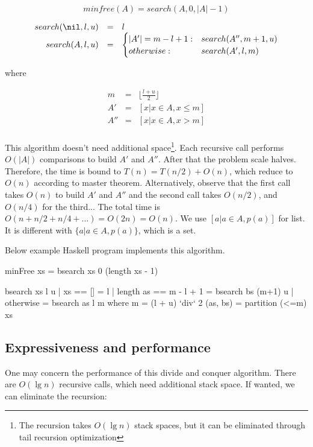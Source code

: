 \documentclass[b5paper]{article}
\begin{document}
\[
minfree(A) = search(A, 0, |A|-1)
\]

\[
\begin{array}{rcl}
search(\nil, l, u) & = & l \\
search(A, l, u) & = & \begin{cases}
       |A'| = m - l + 1 : & search(A'', m+1, u) \\
       otherwise : & search(A',  l, m) \\
\end{cases}
\end{array}
\]

where

\[ \begin{array}{rcl}
m & = & \displaystyle \lfloor \frac{l+u}{2} \rfloor \\
A' & = & [ x | x \in A, x \leq m ] \\
A''& = & [ x | x \in A, x > m ] \\
\end{array} \]

This algorithm doesn't need additional space\footnote{The recursion takes $O(\lg n)$ stack spaces, but it can be eliminated through tail recursion optimization}. Each recursive call performs $O(|A|)$ comparisons to build $A'$ and $A''$. After that the problem scale halves. Therefore, the time is bound to $T(n) = T(n/2) + O(n)$, which reduce to $O(n)$ according to master theorem. Alternatively, observe that the first call takes $O(n)$ to build $A'$ and $A''$ and the second call takes $O(n/2)$, and $O(n/4)$ for the third... The total time is $O(n + n/2 + n/4 + ...) = O(2n) = O(n)$. We use $[a | a \in A, p(a)]$ for list. It is different with $\{a | a \in A, p(a) \}$, which is a set.

Below example Haskell program implements this algorithm.

\begin{Haskell}
minFree xs = bsearch xs 0 (length xs - 1)

bsearch xs l u | xs == [] = l
               | length as == m - l + 1 = bsearch bs (m+1) u
               | otherwise = bsearch as l m
    where
      m = (l + u) `div` 2
      (as, bs) = partition (<=m) xs
\end{Haskell}

\subsection{Expressiveness and performance}
One may concern the performance of this divide and conquer algorithm. There are $O(\lg n)$ recursive calls, which need additional stack space. If wanted, we can eliminate the recursion:
\end{document}
